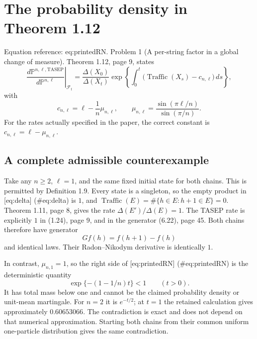 \documentclass[10pt]{article}
\begin{document}
\section*{The probability density in Theorem 1.12}
Equation reference: eq:printedRN. Problem 1 (A per-string factor in a global change of measure).  Theorem 1.12, page 9, states \[
 \left.\frac{d\mathbb P^{n,\ell,\mathrm{TASEP}}}{d\mathbb P^{n,\ell}}
 \right|_{\mathcal F_t}
 =\frac{\Delta(X_0)}{\Delta(X_t)}
 \exp\left\{\int_0^t
       \bigl(\operatorname{Traffic}(X_s)-c_{n,\ell}\bigr)\,ds\right\},\] with \[c_{n,\ell}=\ell-\frac1n\mu_{n,\ell},
 \qquad
 \mu_{n,\ell}=\frac{\sin(\pi\ell/n)}{\sin(\pi/n)}.\] For the rates actually specified in the paper, the correct constant is \(c_{n,\ell}=\ell-\mu_{n,\ell}\).\par
\subsection*{A complete admissible counterexample}
Take any \(n\geq2\), \(\ell=1\), and the same fixed initial state for both chains. This is permitted by Definition 1.9. Every state is a singleton, so the empty product in [eq:delta] (\#eq:delta) is \(1\), and \(\operatorname{Traffic}(E)=\#\{h\in E:h+1\in E\}=0\). Theorem 1.11, page 8, gives the rate \(\Delta(E')/\Delta(E)=1\). The TASEP rate is explicitly \(1\) in (1.24), page 9, and in the generator (6.22), page 45. Both chains therefore have generator \[Gf(h)=f(h+1)-f(h)\] and identical laws. Their Radon–Nikodym derivative is identically \(1\).\par
In contrast, \(\mu_{n,1}=1\), so the right side of [eq:printedRN] (\#eq:printedRN) is the deterministic quantity \[\exp\{-(1-1/n)t\}<1\qquad(t>0).\] It has total mass below one and cannot be the claimed probability density or unit-mean martingale. For \(n=2\) it is \(e^{-t/2}\); at \(t=1\) the retained calculation gives approximately \(0.60653066\). The contradiction is exact and does not depend on that numerical approximation. Starting both chains from their common uniform one-particle distribution gives the same contradiction.\par
\end{document}
